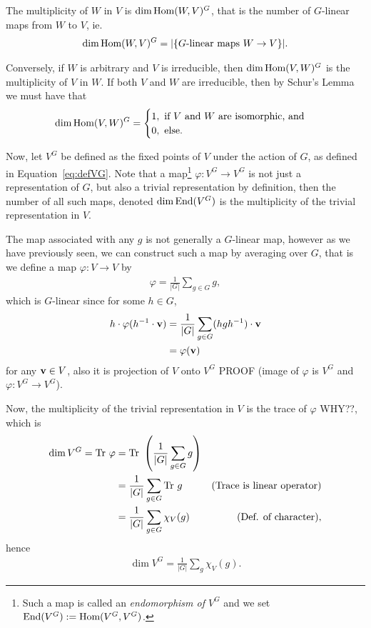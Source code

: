 \begin{conjecture}
	The multiplicity of $W$ in $V$ is $\dim \text{Hom}(W,V)^G$, that is the number of $G$-linear maps from $W$ to $V$, ie. \begin{align*}
		\dim \text{Hom}(W,V)^G = |\{\text{$G$-linear maps $W \rightarrow V$}\}|.
	\end{align*}
\end{conjecture}

Conversely, if $W$ is arbitrary and $V$ is irreducible, then $\dim \text{Hom} (V,W)^G$ is the multiplicity of $V$ in $W$. If both $V$ and $W$ are irreducible, then by Schur's Lemma we must have that
\begin{align}\label{eq:dimhomVWG}
	\dim \text{Hom} (V,W)^G = \begin{cases}
		1, \text{ if $V$ and $W$ are isomorphic, and} \\
		0, \text{ else.}
	\end{cases}
\end{align}

Now, let $V^G$ be defined as the fixed points of $V$ under the action of $G$, as defined in Equation~\ref{eq:defVG}. Note that a map\footnote{Such a map is called an \textit{endomorphism of $V^G$} and we set $\text{End}(V^G) := \text{Hom}(V^G, V^G)$.} $\varphi: V^G \rightarrow V^G$ is not just a representation of $G$, but also a trivial representation by definition, then the number of all such maps, denoted $\dim \text{End}(V^G)$ is the multiplicity of the trivial representation in $V$. 

The map associated with any $g$ is not generally a $G$-linear map, however as we have previously seen, we can construct such a map by averaging over $G$, that is we define a map $\varphi: V \rightarrow V$ by
\begin{align*}
	\varphi = \frac{1}{|G|} \sum_{g \in G} g,
\end{align*}
which is $G$-linear since for some $h \in G$, \begin{align*}
	h \cdot \varphi(h^{-1} \cdot \mathbf{v}) &= \frac{1}{|G|} \sum_{g \in G} (hgh^{-1}) \cdot \mathbf{v} \\
	&= \varphi(\mathbf{v})
\end{align*} for any $\mathbf{v} \in V$, also it is projection of $V$ onto $V^G$ PROOF (image of $\varphi$ is $V^G$ and $\varphi:V^G \rightarrow V^G$). 

Now, the multiplicity of the trivial representation in $V$ is the trace of $\varphi$ WHY??, which is
\begin{align*}
	\dim V^G = \text{Tr } \varphi &= \text{Tr } \left( \frac{1}{|G|} \sum_{g \in G} g \right) \\
	&= \frac{1}{|G|} \sum_{g \in G} \text{Tr } g & \text{(Trace is linear operator)} \\
	&= \frac{1}{|G|} \sum_{g \in G} \chi_{V}(g) & \text{(Def. of character)},
\end{align*}
hence \begin{align}\label{eq:multVG}
	\dim V^G = \frac{1}{|G|} \sum_g \chi_V(g).
\end{align}

